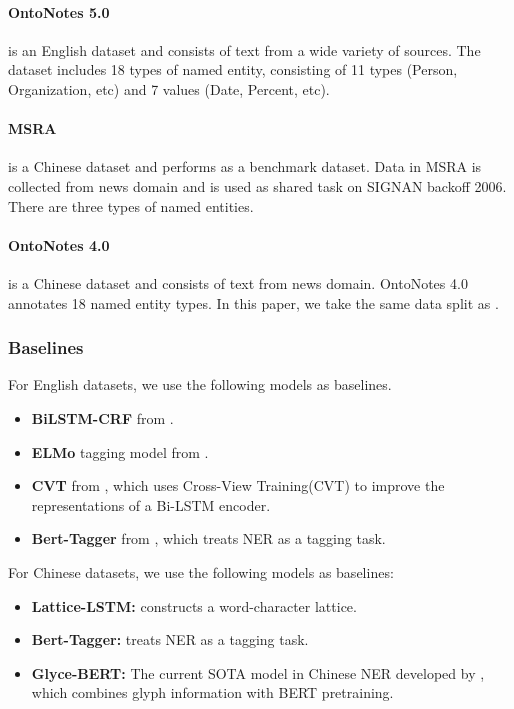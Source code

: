 \documentclass[11pt,a4paper]{article}
\newenvironment{tightitemize}{\begin{itemize}[topsep=0pt, partopsep=0pt] \setlength{\itemsep}{0pt}\setlength{\parskip}{0pt}}{\end{itemize}}
\begin{document}
\paragraph{OntoNotes 5.0} \cite{ontonotes5} is an English dataset and consists of text from a wide variety of sources.
The dataset includes 18 types of named entity, consisting of 11 types (Person, Organization, etc) and 7 values (Date, Percent, etc).  


\paragraph{MSRA} \cite{msra2006ner} is a Chinese dataset and performs as a benchmark dataset. 
Data in MSRA is collected from news domain and is used as shared task on SIGNAN backoff 2006. There are three types of named entities. 


\paragraph{OntoNotes 4.0} \cite{ontonotes4} is a Chinese dataset and consists of text from news domain. 
OntoNotes 4.0 annotates 18 named entity types. In this paper, we take the same data split as . 


\subsubsection{Baselines}  


For English datasets, we use the following models as baselines. 
\begin{tightitemize}
\item {\bf BiLSTM-CRF} from . 
\item {\bf ELMo} tagging model from . 
\item {\bf CVT} from , which uses Cross-View Training(CVT) to improve the representations of a Bi-LSTM encoder. 
\item {\bf Bert-Tagger} from , which treats NER as a tagging task.  
\end{tightitemize}
For Chinese datasets, we use the following models as baselines:
\begin{tightitemize}
\item {\bf Lattice-LSTM:}  constructs a word-character lattice. 
\item {\bf Bert-Tagger:}  treats NER as a tagging task. 
\item {\bf Glyce-BERT:} 
The current SOTA model in Chinese NER developed by , which
 combines glyph information with BERT pretraining. 
\end{tightitemize}
\end{document}
